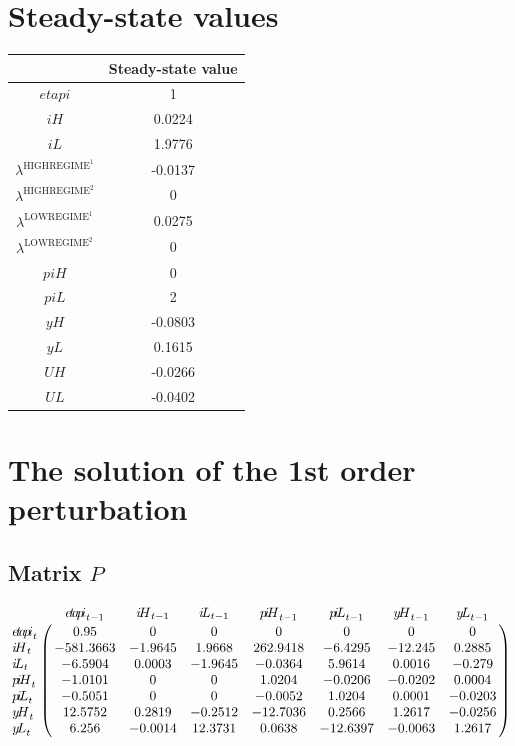 

\section{Steady-state values}


\begin{tabular}{c|c|}
  & Steady-state value\\
\hline
${e\!t\!a\!p\!i}$ & 1 \\
${i\!H}$ & 0.0224 \\
${i\!L}$ & 1.9776 \\
$\lambda^{\mathrm{HIGHREGIME}^{\mathrm{1}}}$ & -0.0137 \\
$\lambda^{\mathrm{HIGHREGIME}^{\mathrm{2}}}$ & 0 \\
$\lambda^{\mathrm{LOWREGIME}^{\mathrm{1}}}$ & 0.0275 \\
$\lambda^{\mathrm{LOWREGIME}^{\mathrm{2}}}$ & 0 \\
${p\!i\!H}$ & 0 \\
${p\!i\!L}$ & 2 \\
${y\!H}$ & -0.0803 \\
${y\!L}$ & 0.1615 \\
${U\!H}$ & -0.0266 \\
${U\!L}$ & -0.0402 \\
\hline
\end{tabular}


\section{The solution of the 1st order perturbation}

\subsection*{Matrix $P$}

$$\bordermatrix{
~ & {e\!t\!a\!p\!i}_{t-1} & {i\!H}_{t-1} & {i\!L}_{t-1} & {p\!i\!H}_{t-1} & {p\!i\!L}_{t-1} & {y\!H}_{t-1} & {y\!L}_{t-1} \cr
{e\!t\!a\!p\!i}_{t} & 0.95 & 0 & 0 & 0 & 0 & 0 & 0 \cr
{i\!H}_{t} & -581.3663 & -1.9645 & 1.9668 & 262.9418 & -6.4295 & -12.245 & 0.2885 \cr
{i\!L}_{t} & -6.5904 & 0.0003 & -1.9645 & -0.0364 & 5.9614 & 0.0016 & -0.279 \cr
{p\!i\!H}_{t} & -1.0101 & 0 & 0 & 1.0204 & -0.0206 & -0.0202 & 0.0004 \cr
{p\!i\!L}_{t} & -0.5051 & 0 & 0 & -0.0052 & 1.0204 & 0.0001 & -0.0203 \cr
{y\!H}_{t} & 12.5752 & 0.2819 & -0.2512 & -12.7036 & 0.2566 & 1.2617 & -0.0256 \cr
{y\!L}_{t} & 6.256 & -0.0014 & 12.3731 & 0.0638 & -12.6397 & -0.0063 & 1.2617 \cr
}$$

